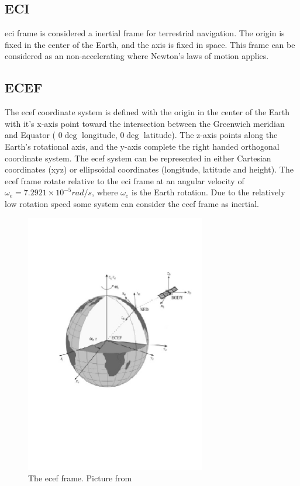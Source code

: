 \subsection{ECI}
\gls{eci} frame is considered a inertial frame for terrestrial navigation. The origin is fixed in the center of the Earth, and the axis is fixed in space. This frame can be considered as an non-accelerating where Newton's laws of motion applies. 
\subsection{ECEF}
The \acrfull{ecef} coordinate system is defined with the origin in the center of the Earth with it's x-axis point toward the intersection between the Greenwich meridian and Equator ( $0\deg $ longitude, $0\deg $ latitude). The z-axis points along the Earth's rotational axis, and the y-axis complete the right handed orthogonal coordinate system. The \gls{ecef} system can be represented in either Cartesian coordinates (xyz) or ellipsoidal coordinates (longitude, latitude and height). The \gls{ecef} frame rotate relative to the \gls{eci} frame at an angular velocity of $\omega_e = 7.2921 \times 10^{-5}rad/s$, where $\omega_e$ is the Earth rotation. Due to the relatively low rotation speed some system can consider the \gls{ecef} frame as inertial.
\begin{figure}[H]
	\centering
		\includegraphics[width=0.7\textwidth]{figs/ECEF-Frame.jpg}
		\caption{The \gls{ecef} frame. Picture from \citep{fossen2011handbook}}
		\label{figure:ECEF}
\end{figure}
